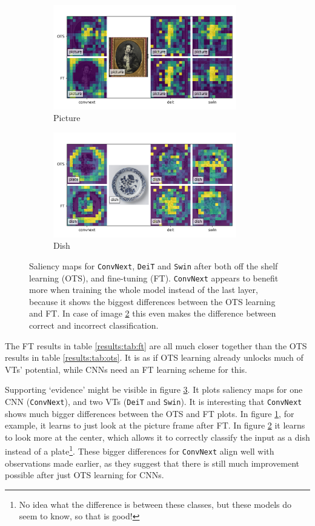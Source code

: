\begin{figure}[tb]
    \centering
    \begin{subfigure}{0.49\textwidth}
    \includegraphics[width=8cm]{img/img011_salience.png}
    \caption{Picture}
    \label{results:img:sal:picture}
    \end{subfigure}
    \begin{subfigure}{0.49\textwidth}
    \includegraphics[width=8cm]{img/img005_salience.png}
    \caption{Dish}
    \label{results:img:sal:dish}
    \end{subfigure}
    \caption{Saliency maps for \texttt{ConvNext}, \texttt{DeiT} and \texttt{Swin} after both off the shelf learning (OTS), and fine-tuning (FT). \texttt{ConvNext} appears to benefit more when training the whole model instead of the last layer, because it shows the biggest differences between the OTS learning and FT. In case of image \ref{results:img:sal:dish} this even makes the difference between correct and incorrect classification.}
    \label{results:img:sal}
\end{figure}

The FT results in table \ref{results:tab:ft} are all much closer together than the OTS results in table \ref{results:tab:ots}. It is as if OTS learning already unlocks much of VTs' potential, while CNNs need an FT learning scheme for this.

Supporting `evidence' might be visible in figure \ref{results:img:sal}. It plots saliency maps for one CNN (\texttt{ConvNext}), and two VTs (\texttt{DeiT} and \texttt{Swin}). It is interesting that \texttt{ConvNext} shows much bigger differences between the OTS and FT plots. In figure \ref{results:img:sal:picture}, for example, it learns to just look at the picture frame after FT. In figure \ref{results:img:sal:dish} it learns to look more at the center, which allows it to correctly classify the input as a dish instead of a plate\footnote{No idea what the difference is between these classes, but these models do seem to know, so that is good!}. %
These bigger differences for \texttt{ConvNext} align well with observations made earlier, as they suggest that there is still much improvement possible after just OTS learning for CNNs.

